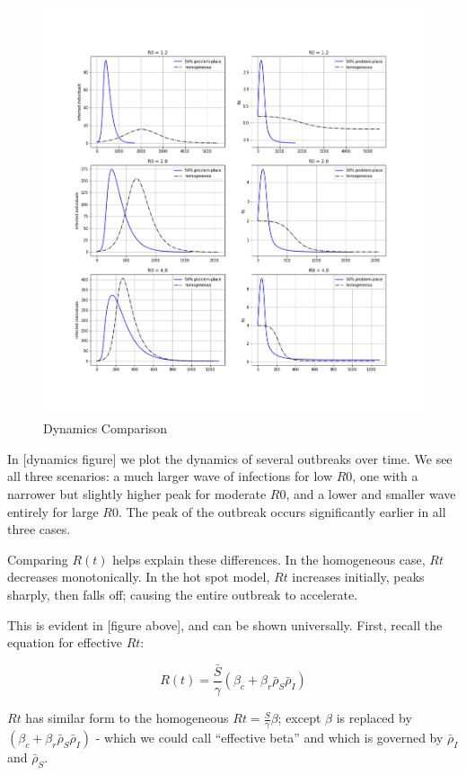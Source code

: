 \begin{figure}
\centering
\includegraphics{images/dynamics_comparison.png}
\caption{Dynamics Comparison}
\end{figure}

In {[}dynamics figure{]} we plot the dynamics of several outbreaks over
time. We see all three scenarios: a much larger wave of infections for
low \(R0\), one with a narrower but slightly higher peak for moderate
\(R0\), and a lower and smaller wave entirely for large \(R0\). The peak
of the outbreak occurs significantly earlier in all three cases.

Comparing \(R(t)\) helps explain these differences. In the homogeneous
case, \(Rt\) decreases monotonically. In the hot spot model, \(Rt\)
increases initially, peaks sharply, then falls off; causing the entire
outbreak to accelerate.

This is evident in {[}figure above{]}, and can be shown universally.
First, recall the equation for effective \(Rt\):

\[R(t) = \frac{\bar S}{\gamma} \left( \beta_c + \beta_r \bar \rho_S \bar \rho_I \right)\]

\(Rt\) has similar form to the homogeneous
\(Rt = \frac{S}{\gamma} \beta\); except \(\beta\) is replaced by
\(\left( \beta_c + \beta_r \bar \rho_S \bar \rho_I \right)\) - which we
could call ``effective beta'' and which is governed by \(\bar\rho_I\)
and \(\bar\rho_S\).

